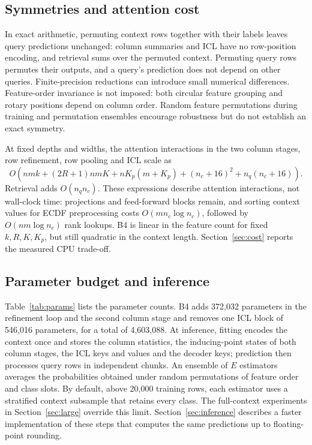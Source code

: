 \documentclass[11pt]{article}
\begin{document}
\subsection{Symmetries and attention cost}
In exact arithmetic, permuting context rows together with their labels leaves query predictions
unchanged: column summaries and ICL have no row-position encoding, and retrieval sums over the
permuted context. Permuting query rows permutes their outputs, and a query's prediction does not
depend on other queries. Finite-precision reductions can introduce small numerical differences.
Feature-order invariance is not imposed: both circular feature grouping and rotary positions depend
on column order. Random feature permutations during training and permutation ensembles encourage
robustness but do not establish an exact symmetry.

At fixed depths and widths, the attention interactions in the two column stages, row refinement,
row pooling and ICL scale as
\begin{equation}
O\!\left(nmk+(2R+1)nmK+nK_p(m+K_p)
 +(n_c+16)^2+n_q(n_c+16)\right).
\end{equation}
Retrieval adds $O(n_qn_c)$. These expressions describe attention interactions, not wall-clock time:
projections and feed-forward blocks remain, and sorting context values for ECDF preprocessing costs
$O(mn_c\log n_c)$, followed by $O(nm\log n_c)$ rank lookups. B4 is linear in the feature count
for fixed $k,R,K,K_p$, but still quadratic
in the context length. Section~\ref{sec:cost} reports the measured CPU trade-off.

\subsection{Parameter budget and inference}
Table~\ref{tab:params} lists the parameter counts. B4 adds 372,032 parameters in the refinement
loop and the second column stage and removes one ICL block of 546,016 parameters, for a total of
4,603,088. At inference, fitting encodes the context once and stores the column statistics, the
inducing-point states of both column stages, the ICL keys and values and the decoder keys; prediction
then processes query rows in independent chunks. An ensemble of $E$
estimators averages the probabilities obtained under random permutations of feature order and class
slots. By default, above 20,000 training rows, each estimator uses a stratified context subsample that
retains every class. The full-context experiments in Section~\ref{sec:large} override this limit.
Section~\ref{sec:inference} describes a faster implementation of these steps that computes the
same predictions up to floating-point rounding.
\end{document}
